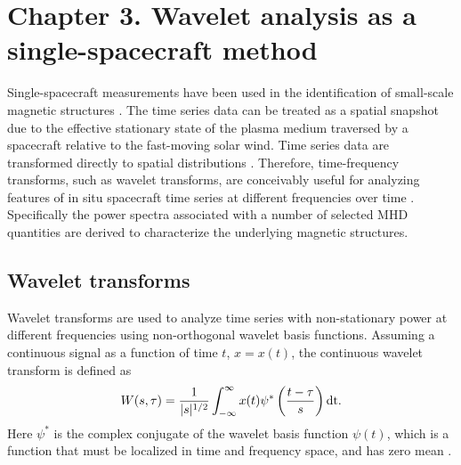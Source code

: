 \chapter{Chapter 3. Wavelet analysis as a single-spacecraft method}

Single-spacecraft measurements have been used in the identification of small-scale magnetic structures \citep{Pecora:2019, Telloni:2012, Hu:2018, Zheng:2018, Zhao:2020}. The time series data can be treated as a spatial snapshot due to the effective stationary state of the plasma medium traversed by a spacecraft relative to the fast-moving solar wind. Time series data are transformed directly to spatial distributions \citep{Taylor:1938}. Therefore, time-frequency transforms, such as wavelet transforms, are conceivably useful for analyzing features of in situ spacecraft time series at different frequencies over time \citep{Torrence:1998}. Specifically the power spectra associated with a number of selected MHD quantities are derived to characterize the underlying magnetic structures.

\section{Wavelet transforms}
Wavelet transforms are used to analyze time series with non-stationary power at different frequencies \citep{Torrence:1998} using non-orthogonal wavelet basis functions. Assuming a continuous signal as a function of time $t$, $x=x(t)$, the continuous wavelet transform is defined as
\begin{equation}
    W(s,\tau) = \frac{1}{|s|^{1/2}}\int_{-\infty}^\infty x(t)\psi^*\left( \frac{t-\tau}{s} \right)\textnormal{dt}.
    \label{eq:wavetrans}
\end{equation}
Here $\psi^*$ is the complex conjugate of the wavelet basis function $\psi(t)$, which is a function that must be localized in time and frequency space, and has zero mean \citep{Torrence:1998}.

